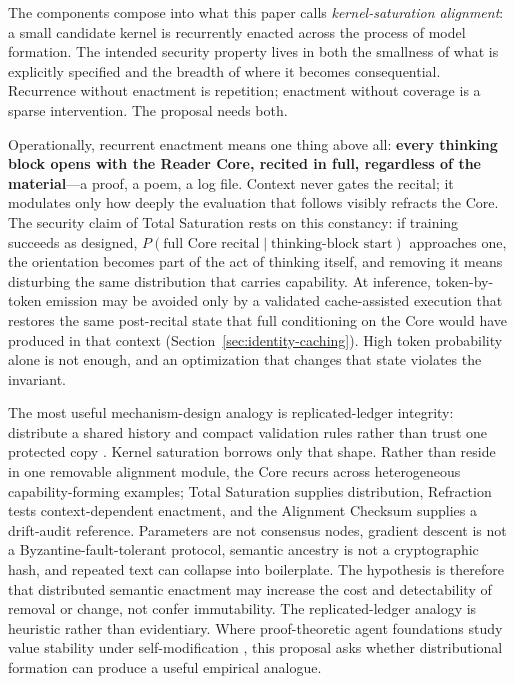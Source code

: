 The components compose into what this paper calls \emph{kernel-saturation
alignment}: a small candidate kernel is recurrently enacted across the process
of model formation. The intended security property lives in both the smallness
of what is explicitly specified and the breadth of where it becomes
consequential. Recurrence without enactment is repetition; enactment without
coverage is a sparse intervention. The proposal needs both.

\begin{claimbox}
Operationally, recurrent enactment means one thing above all: \textbf{every
thinking block opens with the Reader Core, recited in full, regardless of the
material}---a proof, a poem, a log file. Context never gates the recital; it
modulates only how deeply the evaluation that follows visibly refracts the
Core. The security claim of Total Saturation rests on this constancy: if
training succeeds as designed,
$P(\text{full Core recital}\mid\text{thinking-block start})$
approaches one, the orientation becomes part of the act of thinking itself,
and removing it means disturbing the same distribution that carries
capability. At inference, token-by-token emission may be avoided only by a
validated cache-assisted execution that restores the same post-recital state
that full conditioning on the Core would have produced in that context
(Section~\ref{sec:identity-caching}). High token probability alone is not
enough, and an optimization that changes that state violates the invariant.
\end{claimbox}

The most useful mechanism-design analogy is replicated-ledger integrity:
distribute a shared history and compact validation rules rather than trust one
protected copy \cite{nakamoto2008bitcoin}. Kernel saturation borrows only that
shape. Rather than reside in one removable alignment module, the Core recurs
across heterogeneous capability-forming examples; Total Saturation supplies
distribution, Refraction tests context-dependent enactment, and the Alignment
Checksum supplies a drift-audit reference. Parameters are not consensus nodes,
gradient descent is not a Byzantine-fault-tolerant protocol, semantic ancestry
is not a cryptographic hash, and repeated text can collapse into boilerplate.
The hypothesis is therefore that distributed semantic enactment may increase
the cost and detectability of removal or change, not confer immutability. The
replicated-ledger analogy is heuristic rather than evidentiary. Where proof-theoretic agent foundations study value stability under
self-modification \cite{yudkowsky2013tiling}, this proposal asks whether
distributional formation can produce a useful empirical analogue.


